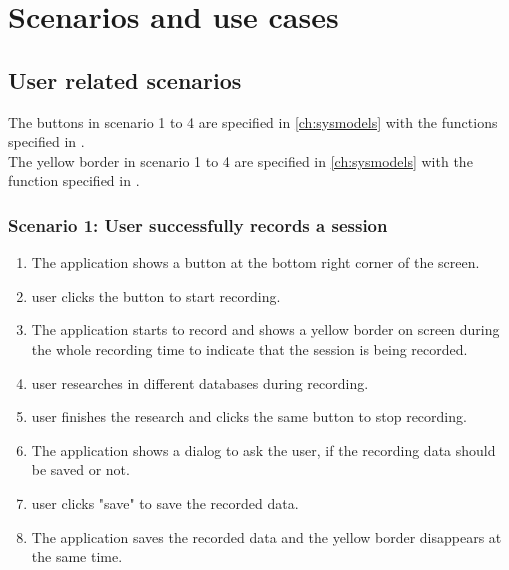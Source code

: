 \chapter{Scenarios and use cases}
\label{ch:scenarios}

\section{User related scenarios}
\newcommand{\see}[1][reference missing]{(see \specref{#1})}
The buttons  in scenario 1 to 4 are specified in \autoref{ch:sysmodels} with the functions specified in .\\
The yellow border in scenario 1 to 4 are specified in \autoref{ch:sysmodels} with the function specified in .

\subsection{Scenario 1: User successfully records a session}
\begin{enumerate}
    \item The application shows a button at the bottom right corner of the screen.
    \item \Gls{user} clicks the button to start recording.
    \item The application starts to record and shows a yellow border on screen during the whole recording time to indicate that the \gls{session} is being recorded.
    \item \Gls{user} researches in different databases during recording.
    \item \Gls{user} finishes the research and clicks the same button to stop recording.
    \item The application shows a dialog to ask the \gls{user}, if the recording data should be saved or not.
    \item \Gls{user} clicks "save" to save the recorded data.
    \item The application saves the recorded data and the yellow border disappears at the same time.
\end{enumerate}

